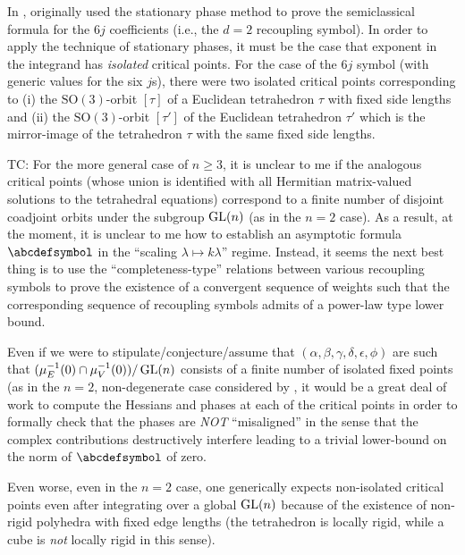 \documentclass[notitlepage, 10pt]{article}
\begin{document}
\begin{rem}
    In \cite{roberts1999classical}, \citeauthor{roberts1999classical} originally used the stationary phase  method to prove the \citeauthor{ponzano1968semiclassical} semiclassical formula \cite{ponzano1968semiclassical} for the $6j$ coefficients (i.e., the $d=2$ recoupling symbol).
    In order to apply the technique of stationary phases, it must be the case that exponent in the integrand has \textit{isolated} critical points.
    For the case of the $6j$ symbol (with generic values for the six $j$s), there were two isolated critical points corresponding to (i) the $\mathrm{SO}(3)$-orbit $[\tau]$ of a Euclidean tetrahedron $\tau$ with fixed side lengths and (ii) the $\mathrm{SO}(3)$-orbit $[\tau']$ of the Euclidean tetrahedron $\tau'$ which is the mirror-image of the tetrahedron $\tau$ with the same fixed side lengths.
    
    {\color{blue}
        TC: For the more general case of $n \geq 3$, it is unclear to me if the analogous critical points (whose union is identified with all Hermitian matrix-valued solutions to the tetrahedral equations) correspond to a finite number of disjoint coadjoint orbits under the subgroup $\operatorname{GL}(n)$ (as in the $n=2$ case). 
        As a result, at the moment, it is unclear to me how to establish an asymptotic formula $\abcdefsymbol$ in the ``scaling $\lambda \mapsto k \lambda$'' regime.
        Instead, it seems the next best thing is to use the ``completeness-type'' relations between various recoupling symbols to prove the existence of a convergent sequence of weights such that the corresponding sequence of recoupling symbols admits of a power-law type lower bound.
    
        Even if we were to stipulate/conjecture/assume that $(\alpha,\beta,\gamma,\delta,\epsilon,\phi)$ are such that $(\mu_{E}^{-1}(0) \cap \mu_{V}^{-1}(0))/\operatorname{GL}(n)$ consists of a finite number of isolated fixed points (as in the $n = 2$, non-degenerate case considered by \citeauthor{roberts1999classical}, it would be a great deal of work to compute the Hessians and phases at each of the critical points in order to formally check that the phases are \textit{NOT} ``misaligned'' in the sense that the complex contributions destructively interfere leading to a trivial lower-bound on the norm of $\abcdefsymbol$ of zero.

        Even worse, even in the $n=2$ case, one generically expects non-isolated critical points even after integrating over a global $\operatorname{GL}(n)$ because of the existence of non-rigid polyhedra with fixed edge lengths (the tetrahedron is locally rigid, while a cube is \textit{not} locally rigid in this sense).
        
    }
\end{rem}
\end{document}
